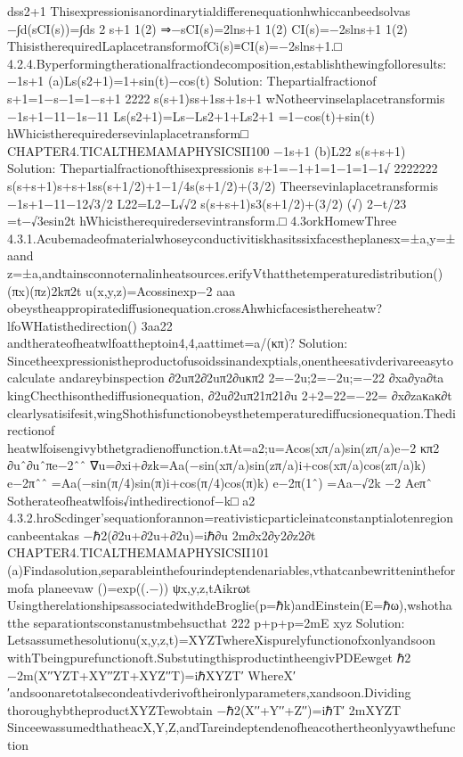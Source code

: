 {dss2+1
Thisexpressionisanordinarytialdifferenequationhwhiccanbeedsolvas
−∫d(sCI(s))=∫ds
2
s+1
1(2)
⇒−sCI(s)=2lns+1
1(2)
CI(s)=−2slns+1
1(2)
ThisistherequiredLaplacetransformofCi(s)≡CI(s)=−2slns+1.□
4.2.4.Byperformingtherationalfractiondecomposition,establishthewingfolloresults:
−1{s+1}
(a)Ls(s2+1)=1+sin(t)−cos(t)
Solution:
Thepartialfractionof
s+1=1−s−1=1−s+1
2222
s(s+1)ss+1ss+1s+1
wNotheervinselaplacetransformis
−1{s+1}−1{1}−1{s}−1{1}
Ls(s2+1)=Ls−Ls2+1+Ls2+1
=1−cos(t)+sin(t)
hWhicistherequiredersevinlaplacetransform□
CHAPTER4.TICALTHEMAMAPHYSICSII100
−1{s+1}
(b)L22
s(s+s+1)
Solution:
Thepartialfractionofthisexpressionis
s+1=−1+1=1−1=1−1√
2222222
s(s+s+1)s+s+1ss(s+1/2)+1−1/4s(s+1/2)+(3/2)
Theersevinlaplacetransformis
−1{s+1}−1{1}−1{2√3/2}
L22=L2−L√√2
s(s+s+1)s3(s+1/2)+(3/2)
(√)
2−t/23
=t−√3esin2t
hWhicistherequiredersevintransform.□
4.3orkHomewThree
4.3.1.Acubemadeofmaterialwhoseyconductivitiskhasitssixfacestheplanesx=±a,y=±aand
z=±a,andtainsconnoternalinheatsources.erifyVthatthetemperaturedistribution()
(πx)(πz)2kπ2t
u(x,y,z)=Acossinexp−2
aaa
obeystheappropiratediffusionequation.crossAhwhicfacesisthereheatw?lfoWHatisthedirection()
3aa22
andtherateofheatwlfoattheptoin4,4,aattimet=a/(κπ)?
Solution:
Sincetheexpressionistheproductofusoidssinandexptials,onentheesativderivareeasytocalculate
andareybinspection
∂2uπ2∂2uπ2∂uκπ2
2=−2u;2=−2u;=−22
∂xa∂ya∂ta
kingChecthisonthediffusionequation,
∂2u∂2uπ21π21∂u
2+2=22=−22=
∂x∂zaκaκ∂t
clearlysatisifesit,wingShothisfunctionobeysthetemperaturediffucsionequation.Thedirectionof
heatwlfoisengivybthetgradienoffunction.tAt=a2;u=Acos(xπ/a)sin(zπ/a)e−2
κπ2
∂uˆ∂uˆπe−2ˆˆ
∇u=∂xi+∂zk=Aa(−sin(xπ/a)sin(zπ/a)i+cos(xπ/a)cos(zπ/a)k)
e−2πˆˆ
=Aa(−sin(π/4)sin(π)i+cos(π/4)cos(π)k)
e−2π(1ˆ)
=Aa−√2k
−2
Aeπˆ
Sotherateofheatwlfois√inthedirectionof−k□
a2
4.3.2.hroScdinger’sequationforannon=reativisticparticleinatconstanptialotenregioncanbeentakas
−ℏ2(∂2u+∂2u+∂2u)=iℏ∂u
2m∂x2∂y2∂z2∂t
CHAPTER4.TICALTHEMAMAPHYSICSII101
(a)Findasolution,separableinthefourindeptendenariables,vthatcanbewrittenintheformofa
planeevaw
()=exp((.−))
ψx,y,z,tAikrωt
UsingtherelationshipsassociatedwithdeBroglie(p=ℏk)andEinstein(E=ℏω),wshothatthe
separationtsconstanustmbehsucthat
222
p+p+p=2mE
xyz
Solution:
Letsassumethesolutionu(x,y,z,t)=XYZTwhereXispurelyfunctionofxonlyandsoon
withTbeingpurefunctionoft.SubstutingthisproductintheengivPDEewget
ℏ2
−2m(X′′YZT+XY′′ZT+XYZ′′T)=iℏXYZT′
WhereX′′andsoonaretotalsecondeativderivoftheironlyparameters,xandsoon.Dividing
thoroughybtheproductXYZTewobtain
−ℏ2(X′′+Y′′+Z′′)=iℏT′
2mXYZT
SinceewassumedthatheacX,Y,Z,andTareindeptendenofheacothertheonlyyawthefunction
}
